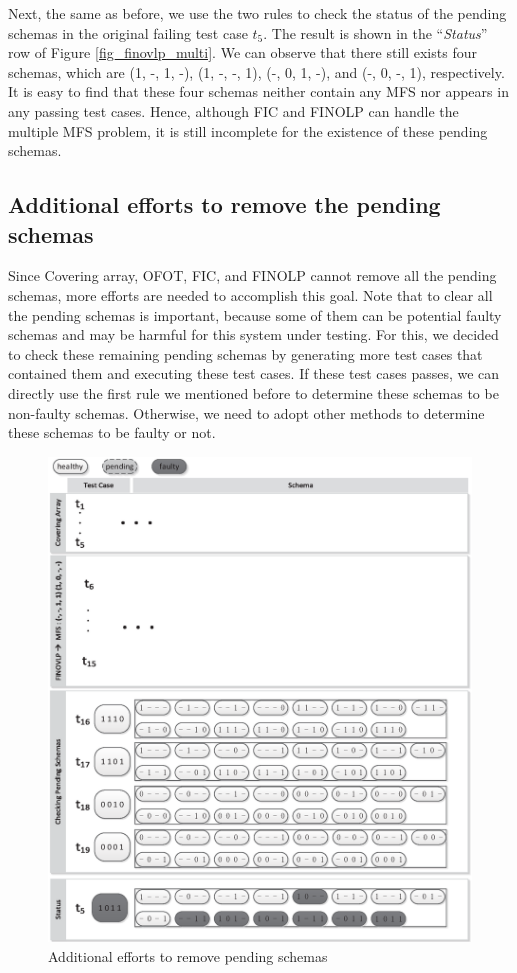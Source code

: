 Next, the same as before, we use the two rules to check the status of the pending schemas in the original failing test case $t_{5}$. The result is shown in the ``\emph{Status}'' row of Figure \ref{fig_finovlp_multi}. We can observe that there still exists four schemas, which are (1, -, 1, -), (1, -, -, 1), (-, 0, 1, -), and (-, 0, -, 1), respectively. It is easy to find that these four schemas neither contain any MFS nor appears in any passing test cases. Hence, although FIC and FINOLP can handle the multiple MFS problem, it is still incomplete for the existence of these pending schemas.

\subsection{Additional efforts to remove the pending schemas}

Since Covering array, OFOT, FIC, and FINOLP cannot remove all the pending schemas, more efforts are needed to accomplish this goal. Note that to clear all the pending schemas is important, because some of them can be potential faulty schemas and may be harmful for this system under testing. For this, we decided to check these remaining pending schemas by generating more test cases that contained them and executing these test cases. If these test cases passes, we can directly use the first rule we mentioned before to determine these schemas to be non-faulty schemas. Otherwise, we need to adopt other methods to determine these schemas to be faulty or not.

\begin{figure}[!htb]
 \centering
 \includegraphics[width=5.3in]{non-pending.eps}
 \caption{Additional efforts to remove pending schemas}
 \label{fig_no_pending}
\end{figure}

